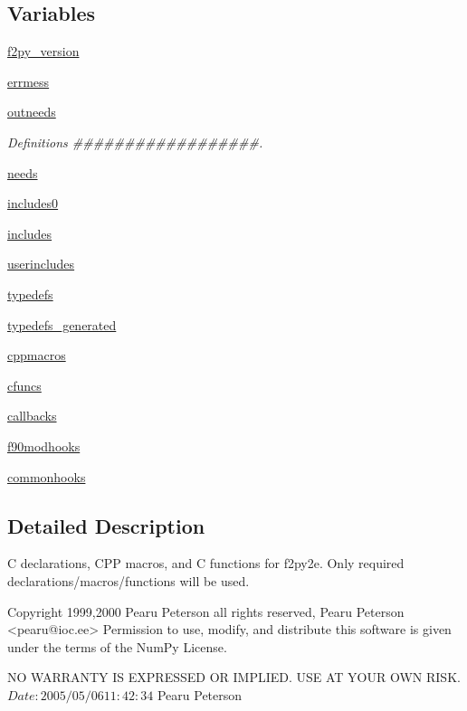 \subsection*{Variables}
\begin{DoxyCompactItemize}
\item 
\hyperlink{namespacenumpy_1_1f2py_1_1cfuncs_a03c2cff2fdac14c6b04cc960d3004ccc}{f2py\+\_\+version}
\item 
\hyperlink{namespacenumpy_1_1f2py_1_1cfuncs_ad7ae3fecb78f1f572b8bc4ad409341f4}{errmess}
\item 
\hyperlink{namespacenumpy_1_1f2py_1_1cfuncs_aba38409a38d521ec183004982623472b}{outneeds}
\begin{DoxyCompactList}\small\item\em Definitions \#\#\#\#\#\#\#\#\#\#\#\#\#\#\#\#\#\#. \end{DoxyCompactList}\item 
\hyperlink{namespacenumpy_1_1f2py_1_1cfuncs_a472e0c029794c56618781ef05b111739}{needs}
\item 
\hyperlink{namespacenumpy_1_1f2py_1_1cfuncs_a768d748cc9ccdfc942fef123921f02ec}{includes0}
\item 
\hyperlink{namespacenumpy_1_1f2py_1_1cfuncs_a0298fdeef563daf0b48b8d8c9eec1d14}{includes}
\item 
\hyperlink{namespacenumpy_1_1f2py_1_1cfuncs_a6ac15c81539b7d99029b2934a3b2a6e8}{userincludes}
\item 
\hyperlink{namespacenumpy_1_1f2py_1_1cfuncs_a440636d12cf31b46553eaa80db099a6d}{typedefs}
\item 
\hyperlink{namespacenumpy_1_1f2py_1_1cfuncs_a68686ad4e12703f4e2d0ceb5ec795ac3}{typedefs\+\_\+generated}
\item 
\hyperlink{namespacenumpy_1_1f2py_1_1cfuncs_a7ed8a8819dd36928ced38ad7cdcdd69a}{cppmacros}
\item 
\hyperlink{namespacenumpy_1_1f2py_1_1cfuncs_a6f68564470af3f6bfccd482b9bbfdafa}{cfuncs}
\item 
\hyperlink{namespacenumpy_1_1f2py_1_1cfuncs_abdd2bf5d1cde9ad34352a2f89f44621d}{callbacks}
\item 
\hyperlink{namespacenumpy_1_1f2py_1_1cfuncs_a2437d2304f5dc5b764bec8f84d65d5cc}{f90modhooks}
\item 
\hyperlink{namespacenumpy_1_1f2py_1_1cfuncs_ae26c2d135b69d054dde621dd47dc83e0}{commonhooks}
\end{DoxyCompactItemize}


\subsection{Detailed Description}
\begin{DoxyVerb}C declarations, CPP macros, and C functions for f2py2e.
Only required declarations/macros/functions will be used.

Copyright 1999,2000 Pearu Peterson all rights reserved,
Pearu Peterson <pearu@ioc.ee>
Permission to use, modify, and distribute this software is given under the
terms of the NumPy License.

NO WARRANTY IS EXPRESSED OR IMPLIED.  USE AT YOUR OWN RISK.
$Date: 2005/05/06 11:42:34 $
Pearu Peterson\end{DoxyVerb}
 

